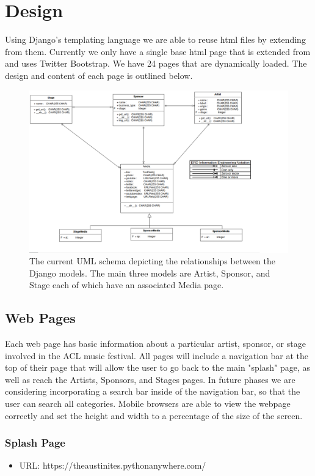 \documentclass[12pt,english]{scrartcl}
\begin{document}
\section{Design}

Using Django's templating language we are able to reuse html files by extending from them. Currently we only have a single base html page that is extended from and 
uses Twitter Bootstrap. We have 24 pages that are dynamically loaded. The design and content of each page is outlined below.
\begin{figure}[h!]
\includegraphics[width=\textwidth]{uml_phase2}
 \caption{The current UML schema depicting the relationships between the Django models. The main three models are Artist, Sponsor, and Stage each of which have an associated Media page.}
\end{figure}

\subsection{Web Pages}
Each web page has basic information about a particular artist, sponsor, or stage involved in the ACL music festival.
All pages will include a navigation bar at the top of their page that will allow the user to go back to the main "splash" page, as well as reach the Artists, Sponsors, and
Stages pages. In future phases we are considering incorporating a search bar inside of the navigation bar, so that the user can search
all categories. Mobile browsers are able to view the webpage correctly and set the height and width to a percentage of the size of the screen.

\subsubsection{Splash Page}
\begin{itemize}
 \item URL: https://theaustinites.pythonanywhere.com/
\end{itemize}
\end{document}
